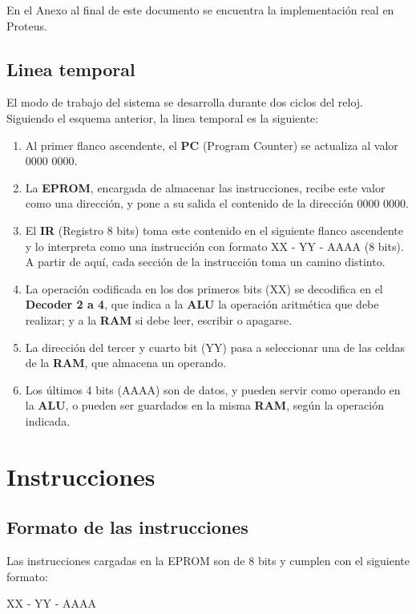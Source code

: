 \documentclass{sciposter}
\begin{document}
\begin{multicols*}{2}
En el Anexo al final de este documento se encuentra la implementación real en Proteus.

\subsection{Linea temporal}

El modo de trabajo del sistema se desarrolla durante dos ciclos del reloj. Siguiendo el esquema anterior, la linea temporal es la siguiente:

\begin{enumerate}
    \item Al primer flanco ascendente, el \textbf{PC} (Program Counter) se actualiza al valor 0000 0000.
    \item La \textbf{EPROM}, encargada de almacenar las instrucciones, recibe este valor como una dirección, y pone a su salida el contenido de la dirección 0000 0000.
    \item El \textbf{IR} (Registro 8 bits) toma este contenido en el siguiente flanco ascendente y lo interpreta como una instrucción con formato XX - YY - AAAA (8 bits). A partir de aquí, cada sección de la instrucción toma un camino distinto.
    \item La operación codificada en los dos primeros bits (XX) se decodifica en el \textbf{Decoder 2 a 4}, que indica a la \textbf{ALU} la operación aritmética que debe realizar; y a la \textbf{RAM} si debe leer, escribir o apagarse.
    \item La dirección del tercer y cuarto bit (YY) pasa a seleccionar una de las celdas de la \textbf{RAM}, que almacena un operando.
    \item Los últimos 4 bits (AAAA) son de datos, y pueden servir como operando en la \textbf{ALU}, o pueden ser guardados en la misma \textbf{RAM}, según la operación indicada.
\end{enumerate}

\section{Instrucciones}
\subsection{Formato de las instrucciones}

Las instrucciones cargadas en la EPROM son de 8 bits y cumplen con el siguiente formato:

\begin{center}
    XX - YY - AAAA
\end{center}


\end{multicols*}
\end{document}

